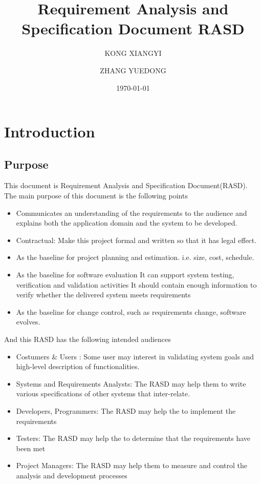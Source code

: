 \documentclass[a4paper,12pt]{book}
\begin{document}
 
	
\title{Requirement Analysis and Specification Document RASD}
\author{KONG XIANGYI\and ZHANG YUEDONG}
\date{\today}


\frontmatter
\maketitle


\tableofcontents

\mainmatter

\chapter{Introduction} \label{C1:Introduction}

\section{Purpose}
This document is Requirement Analysis and Specification Document(RASD). The main purpose of this document is the following points
\begin{itemize}
	\item Communicates an understanding of the requirements to the audience and explains both the application domain and the system to be developed.
	\item Contractual: Make this project formal and written so that it has legal effect.
	\item As the baseline for project planning and estimation. i.e. size, cost, schedule. 
	\item As the baseline for software evaluation
		\subitem It can support system testing, verification and validation activities
		\subitem It should contain enough information to verify whether the delivered system meets requirements
	\item As the baseline for change control, such as requirements change, software evolves.
\end{itemize}
And this RASD has the following intended audiences
\begin{itemize}
	\item Costumers \& Users : Some user may interest in validating system goals and high-level description of functionalities.
	\item Systems and Requirements Analysts: The RASD may help them to write various specifications of other systems that inter-relate.
	\item Developers, Programmers: The RASD may help the to implement the requirements
	\item Testers: The RASD may help the to determine that the requirements have been met
	\item Project Managers: The RASD may help them to measure and control the analysis and development processes
\end{itemize}
\end{document}
